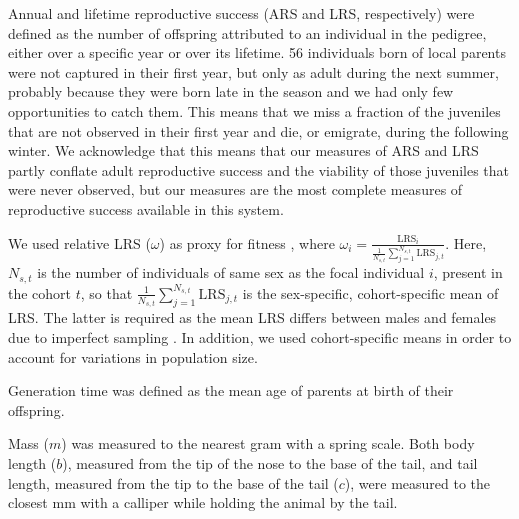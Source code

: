 Annual and lifetime reproductive success (ARS and LRS, respectively) were defined as the number of offspring attributed to an individual in the pedigree, either over a specific year or over its lifetime. 56 individuals born of local parents were not captured in their first year, but only as adult during the next summer, probably because they were born late in the season and we had only few opportunities to catch them. This means that we miss a fraction of the juveniles that are not observed in their first year and die, or emigrate, during the following winter. We acknowledge that this means that our measures of ARS and LRS partly conflate adult reproductive success and the viability of those juveniles that were never observed, but our measures are the most complete measures of reproductive success available in this system.

We used relative LRS ($\omega$) as proxy for fitness \parencite{Lande1983}, where $ \omega_{i} = \frac{\mathrm{LRS}_{i}}{\frac{1}{N_{s,t}}\sum_{j=1}^{N_{s,t}} {\mathrm{LRS}_{j,t}}} $. Here, $N_{s,t}$ is the number of individuals of same sex as the focal individual $i$, present in the cohort $t$, so that $\frac{1}{N_{s,t}}\sum_{j=1}^{N_{s,t}} {\mathrm{LRS}_{j,t}}$ is the sex-specific, cohort-specific mean of LRS. The latter is required as the mean LRS differs between males and females due to imperfect sampling \parencite{Morrissey2012sts}. In addition, we used cohort-specific means in order to account for variations in population size.

Generation time was defined as the mean age of parents at birth of their offspring\parencite{Charleworth1994}.

Mass ($m$) was measured to the nearest gram with a spring scale. Both body length ($b$), measured from the tip of the nose to the base of the tail, and tail length, measured from the tip to the base of the tail ($c$), were measured to the closest mm with a calliper while holding the animal by the tail. 

